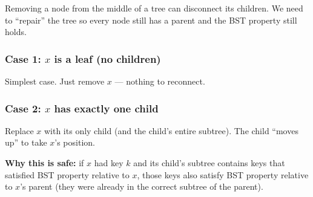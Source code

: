 \documentclass[11pt]{article}
\begin{document}
\begin{warnbox}
Removing a node from the middle of a tree can disconnect its children. We need to ``repair'' the tree so every node still has a parent and the BST property still holds.
\end{warnbox}

\subsubsection*{Case 1: $x$ is a leaf (no children)}

Simplest case. Just remove $x$ — nothing to reconnect.

\begin{center}
\end{center}

\subsubsection*{Case 2: $x$ has exactly one child}

Replace $x$ with its only child (and the child's entire subtree). The child ``moves up'' to take $x$'s position.

\textbf{Why this is safe:} if $x$ had key $k$ and its child's subtree contains keys that satisfied BST property relative to $x$, those keys also satisfy BST property relative to $x$'s parent (they were already in the correct subtree of the parent).
\end{document}
